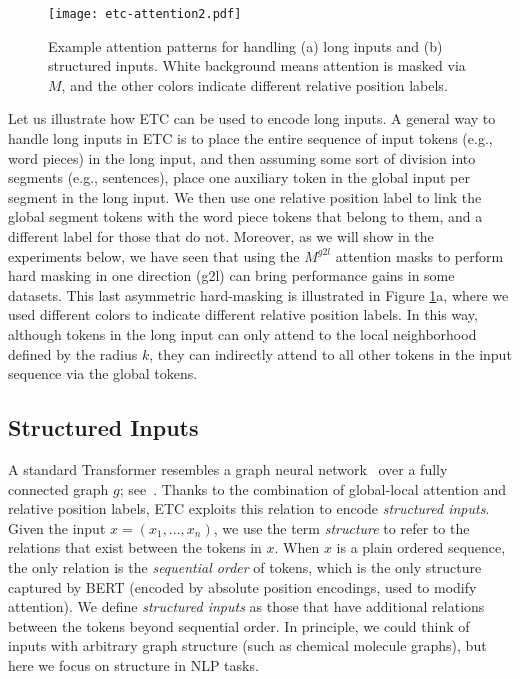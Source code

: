 \documentclass[11pt,a4paper]{article}
\begin{document}
\begin{figure}[t!]
	\texttt{[image: etc-attention2.pdf]}
	\centering
	\caption{Example attention patterns for handling (a) long inputs and (b) structured inputs. White background means attention is masked via $M$, and the other colors indicate different relative position labels.}
	\label{fig:etc-attention2}
\end{figure}

Let us illustrate how ETC can be used to encode long inputs. A general way to handle long inputs in ETC is to place the entire sequence of input tokens (e.g., word pieces) in the long input, and then assuming some sort of division into segments (e.g., sentences), place one auxiliary token in the global input per segment in the long input. We then use one relative position label to link the global segment tokens with the word piece tokens that belong to them, and a different label for those that do not. Moreover, as we will show in the experiments below, we have seen that using the $M^{g2l}$ attention masks to perform hard masking in one direction (g2l) can bring performance gains in some datasets. This last asymmetric hard-masking is illustrated in Figure \ref{fig:etc-attention2}a, where we used different colors to indicate different relative position labels. In this way, although tokens in the long input can only attend to the local neighborhood defined by the radius $k$, they can indirectly attend to all other tokens in the input sequence via the global tokens. 

\subsection{Structured Inputs}\label{subsec:structure}

A standard Transformer resembles a graph neural network~\cite{scarselli2008graph} over a fully connected graph $g$; see~\citet{ye2019bp}. Thanks to the combination of global-local attention and relative position labels, ETC exploits this relation to encode {\em structured inputs}. 
Given the input $x = (x_1, ..., x_n)$, we use the term {\em structure} to refer to the relations that exist between the tokens in $x$. When $x$ is a plain ordered sequence, the only relation is the {\em sequential order} of tokens, which is the only structure captured by BERT (encoded by absolute position encodings, used to modify attention). We define {\em structured inputs} as those that have additional relations between the tokens beyond sequential order. In principle, we could think of inputs with arbitrary graph structure (such as chemical molecule graphs), but here we focus on structure in NLP tasks.
\end{document}
